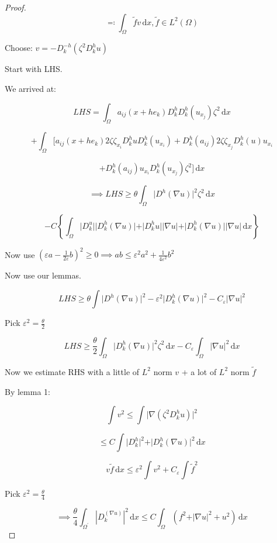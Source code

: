 \documentclass{article}
\theoremstyle{definition}
\begin{document}
\begin{proof}
\[
    \eqqcolon \int_{\Omega} \tilde{f} v \,\mathrm{d}x, \tilde{f}\in L^2(\Omega)
\]

Choose: \(v = - D^{-h} _k (\zeta^2 D_k^h u)\) 

Start with LHS.

We arrived at:

\[
    LHS = \int_{\Omega} a_{ij} (x+he_k)D^h_k D^h _{k} (u_{x_{j}}) \zeta^2 \,\mathrm{d}x
\]

\[
    + \int_{\Omega} \bigg[ a_{ij}(x+he_k) 2 \zeta \zeta_{x_i} D_k^h u D_k^h (u_{x_i})+ D_k^h (a_{ij}) 2 \zeta \zeta _{x_j} D_k^h (u) u_{x_i} 
\]

\[    
    + D_k^h (a_{ij}) u_{x_i} D_k^h (u_{x_j}) \zeta^2 \bigg]  \,\mathrm{d}x  
\]

\[
    \implies LHS \geq \theta \int_{\Omega} \vert D^h(\nabla u) \vert ^2 \zeta^2 \,\mathrm{d}x 
\]

\[
    - C \left\{ \int_{\Omega} \vert D_k^ u \vert \vert D_k^h (\nabla u) \vert + \vert D_k^h u  \vert \vert \nabla u \vert + \vert D_k^h (\nabla u) \vert \vert \nabla u \vert \, \mathrm{d}x  \right\} 
\]

Now use \(\left( \varepsilon a - \frac{1}{2 \varepsilon} b \right) ^2 \geq 0 \implies ab \leq \varepsilon^2 a^2 + \frac{1}{4 \varepsilon^2} b^2 \) 

Now use our lemmas.

\[
    LHS \geq \theta \int \vert D^h (\nabla u) \vert ^2 - \varepsilon^2 \vert D_k^h (\nabla u) \vert ^ 2 - C_{\varepsilon} \vert \nabla u \vert ^ 2
\]

Pick \(\varepsilon^2 = \frac{\theta}{2}\) 

\[
    LHS \geq \frac{\theta}{2} \int_{\Omega} \vert D^h_k (\nabla u) \vert^2 \zeta^2\,\mathrm{d}x - C_{\varepsilon} \int_{\Omega} \vert \nabla u \vert ^ 2 \,\mathrm{d}x 
\]

Now we estimate RHS with a little of \(L^2\) norm \(v\) + a lot of \(L^2\) norm \(\tilde{f}\) 

By lemma 1:

\[
    \int v^2 \leq \int \vert \nabla (\zeta^2 D_k^h u) \vert ^ 2
\]

\[
    \leq  C \int \vert D_k^h \vert ^ 2 + \vert D_k^h (\nabla u) \vert ^ 2 \, \mathrm{d}x
\]

\[
    v \tilde{f}\, \mathrm{d}x\leq \varepsilon^2 \int v^2 + C_{\varepsilon} \int \tilde{f} ^2
\]

Pick \(\varepsilon^2 = \frac{\theta}{4}\) 

\[
    \implies \frac{\theta}{4} \int_{\Omega ^{\prime} } \left\vert D_k^ (\nabla u) \right\vert ^ 2 \,\mathrm{d}x \leq C \int_{\Omega} (f^2 + \vert \nabla u\vert^2 + u^2) \,\mathrm{d}x 
\]


\end{proof}
\end{document}
